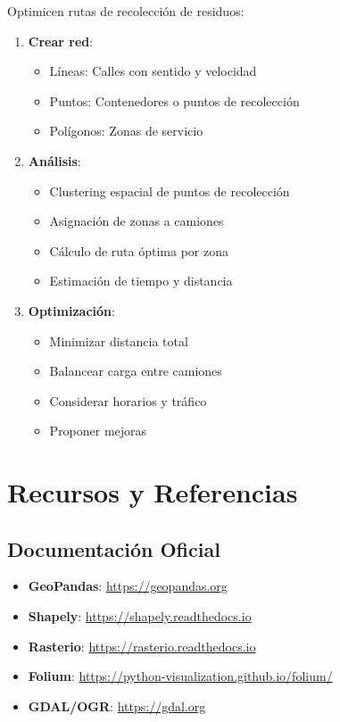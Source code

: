 \documentclass[11pt,a4paper]{article}
\newcommand{\ejercicio}[1]{\begin{tcolorbox}[colback=red!5,colframe=red,title={Ejercicio}]#1\end{tcolorbox}}
\begin{document}
\ejercicio{
Optimicen rutas de recolección de residuos:

\begin{enumerate}
    \item \textbf{Crear red}:
    \begin{itemize}
        \item Líneas: Calles con sentido y velocidad
        \item Puntos: Contenedores o puntos de recolección
        \item Polígonos: Zonas de servicio
    \end{itemize}
    
    \item \textbf{Análisis}:
    \begin{itemize}
        \item Clustering espacial de puntos de recolección
        \item Asignación de zonas a camiones
        \item Cálculo de ruta óptima por zona
        \item Estimación de tiempo y distancia
    \end{itemize}
    
    \item \textbf{Optimización}:
    \begin{itemize}
        \item Minimizar distancia total
        \item Balancear carga entre camiones
        \item Considerar horarios y tráfico
        \item Proponer mejoras
    \end{itemize}
\end{enumerate}
}

\newpage

\section{Recursos y Referencias}

\subsection{Documentación Oficial}

\begin{itemize}
    \item \textbf{GeoPandas}: \url{https://geopandas.org}
    \item \textbf{Shapely}: \url{https://shapely.readthedocs.io}
    \item \textbf{Rasterio}: \url{https://rasterio.readthedocs.io}
    \item \textbf{Folium}: \url{https://python-visualization.github.io/folium/}
    \item \textbf{GDAL/OGR}: \url{https://gdal.org}
\end{itemize}
\end{document}
